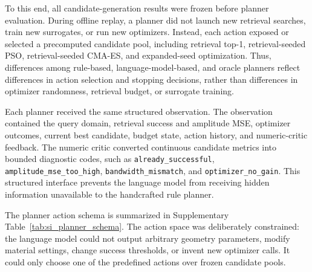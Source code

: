 \documentclass[final,1p,times]{elsarticle}
\newcommand{\code}[1]{\texttt{#1}}
\begin{document}
To this end, all candidate-generation results were frozen before planner evaluation. During offline replay, a planner did not launch new retrieval searches, train new surrogates, or run new optimizers. Instead, each action exposed or selected a precomputed candidate pool, including retrieval top-1, retrieval-seeded PSO, retrieval-seeded CMA-ES, and expanded-seed optimization. Thus, differences among rule-based, language-model-based, and oracle planners reflect differences in action selection and stopping decisions, rather than differences in optimizer randomness, retrieval budget, or surrogate training.

Each planner received the same structured observation. The observation contained the query domain, retrieval success and amplitude MSE, optimizer outcomes, current best candidate, budget state, action history, and numeric-critic feedback. The numeric critic converted continuous candidate metrics into bounded diagnostic codes, such as \code{already\_successful}, \code{amplitude\_mse\_too\_high}, \code{bandwidth\_mismatch}, and \code{optimizer\_no\_gain}. This structured interface prevents the language model from receiving hidden information unavailable to the handcrafted rule planner.

The planner action schema is summarized in Supplementary Table~\ref{tab:si_planner_schema}. The action space was deliberately constrained: the language model could not output arbitrary geometry parameters, modify material settings, change success thresholds, or invent new optimizer calls. It could only choose one of the predefined actions over frozen candidate pools.
\end{document}
